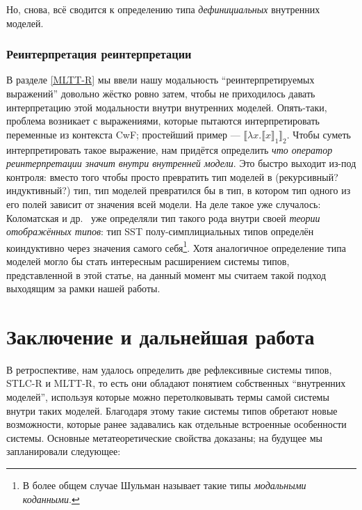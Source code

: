 Но, снова, всё сводится к определению типа
\emph{дефинициальных} внутренних моделей.

\subsubsection{Реинтерпретация реинтерпретации}

В разделе \ref{MLTT-R} мы ввели нашу модальность
``реинтерпретируемых выражений'' довольно жёстко ровно
затем, чтобы не приходилось давать интерпретацию этой
модальности внутри внутренних моделей. Опять-таки,
проблема возникает с выражениями, которые пытаются
интерпретировать переменные из контекста CwF;
простейший пример — $\llbracket \lambda x.\llbracket x
\rrbracket_1\rrbracket_2$. Чтобы суметь
интерпретировать такое выражение, нам придётся
определить \textit{что оператор реинтерпретации значит
внутри внутренней модели}. Это быстро выходит из-под
контроля: вместо того чтобы просто превратить тип
моделей в (рекурсивный? индуктивный?) тип, тип моделей
превратился бы в тип, в котором тип одного из его полей
зависит от значения всей модели. На деле такое уже
случалось: Коломатская и
др.~\cite{Kolomatskaia_Shulman_2025} уже определяли тип
такого рода внутри своей \textit{теории отображённых
типов}: тип SST полу-симплициальных типов определён
коиндуктивно через значения самого себя\footnote{В
более общем случае Шульман называет такие типы
\textit{модальными коданными}\cite{shulman2026}.}. Хотя
аналогичное определение типа моделей могло бы стать
интересным расширением системы типов, представленной в
этой статье, на данный момент мы считаем такой подход
выходящим за рамки нашей работы.

\section{Заключение и дальнейшая работа}

В ретроспективе, нам удалось определить две
рефлексивные системы типов, STLC-R и MLTT-R, то есть
они обладают понятием собственных ``внутренних
моделей'', используя которые можно перетолковывать
термы самой системы внутри таких моделей. Благодаря
этому такие системы типов обретают новые возможности,
которые ранее задавались как отдельные встроенные
особенности системы. Основные метатеоретические
свойства доказаны; на будущее мы запланировали
следующее:

